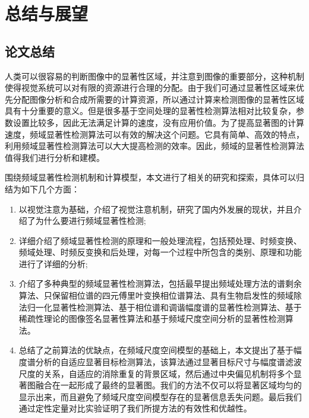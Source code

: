 
\chapter{总结与展望}
\label{cha5}

\section{论文总结}
\label{5_1}

人类可以很容易的判断图像中的显著性区域，并注意到图像的重要部分，这种机制使得视觉系统可以对有限的资源进行合理的分配。由于我们可通过显著性区域来优先分配图像分析和合成所需要的计算资源，所以通过计算来检测图像的显著性区域具有十分重要的意义。但是很多基于空间处理的显著性检测算法相对比较复杂，参数设置比较多，因此无法满足计算的速度，没有应用价值。为了提高显著图的计算速度，频域显著性检测算法可以有效的解决这个问题。它具有简单、高效的特点，利用频域显著性检测算法可以大大提高检测的效率。因此，频域的显著性检测算法值得我们进行分析和建模。

围绕频域显著性检测机制和计算模型，本文进行了相关的研究和探索，具体可以归结为如下几个方面：
\begin{enumerate}
\item 以视觉注意为基础，介绍了视觉注意机制，研究了国内外发展的现状，并且介绍了为什么要进行频域显著性检测;
\item 详细介绍了频域显著性检测的原理和一般处理流程，包括预处理、时频变换、频域处理、时频反变换和后处理，对每一个过程中所包含的类别、原理和功能进行了详细的分析;
\item 介绍了多种典型的频域显著性检测算法，包括最早提出频域处理方法的谱剩余算法、只保留相位谱的四元傅里叶变换相位谱算法、具有生物启发性的频域除法归一化显著性检测算法、基于相位谱和调谐幅度谱的显著性检测算法、基于稀疏性理论的图像签名显著性算法和基于频域尺度空间分析的显著性检测算法。
\item 总结了之前算法的优缺点，在频域尺度空间模型的基础上，本文提出了基于幅度谱分析的自适应显著目标检测算法，该算法通过显著目标尺寸与幅度谱滤波尺度的关系，自适应的消除重复的背景区域，然后通过中央偏见机制将多个显著图融合在一起形成了最终的显著图。我们的方法不仅可以将显著区域均匀的显示出来，而且避免了频域尺度空间模型存在的显著信息丢失问题。最后我们通过定性定量对比实验证明了我们所提方法的有效性和优越性。
\end{enumerate}

